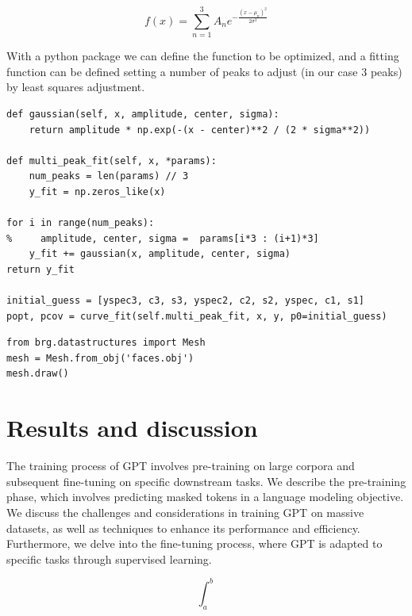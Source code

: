 \documentclass[a4paper,10pt,twocolumn]{article}
\begin{document}
\begin{equation}
f(x) = \sum_{n = 1}^{3} A_{n} e^{-\frac{(x - \mu_{n})^2}{2\sigma^2}}
\end{equation}

With a python package we can define the function to be optimized, and a fitting function can be defined setting a number of peaks to adjust (in our case 3 peaks) by least squares adjustment.

\begin{lstlisting}[basicstyle=\fontsize{5}{4}\selectfont\ttfamily]
def gaussian(self, x, amplitude, center, sigma):
    return amplitude * np.exp(-(x - center)**2 / (2 * sigma**2))

def multi_peak_fit(self, x, *params):
    num_peaks = len(params) // 3
    y_fit = np.zeros_like(x)

for i in range(num_peaks):
%     amplitude, center, sigma =  params[i*3 : (i+1)*3]
    y_fit += gaussian(x, amplitude, center, sigma)
return y_fit

initial_guess = [yspec3, c3, s3, yspec2, c2, s2, yspec, c1, s1]
popt, pcov = curve_fit(self.multi_peak_fit, x, y, p0=initial_guess)

\end{lstlisting}

\begin{lstlisting}[basicstyle=\fontsize{5}{4}\selectfont\ttfamily]
from brg.datastructures import Mesh
mesh = Mesh.from_obj('faces.obj')
mesh.draw()
\end{lstlisting}


\section{Results and discussion}
The training process of GPT involves pre-training on large corpora and subsequent fine-tuning on specific downstream tasks. We describe the pre-training phase, which involves predicting masked tokens in a language modeling objective. We discuss the challenges and considerations in training GPT on massive datasets, as well as techniques to enhance its performance and efficiency. Furthermore, we delve into the fine-tuning process, where GPT is adapted to specific tasks through supervised learning.

    \begin{equation}
    \int_{a}^{b}
    \end{equation}
\end{document}
